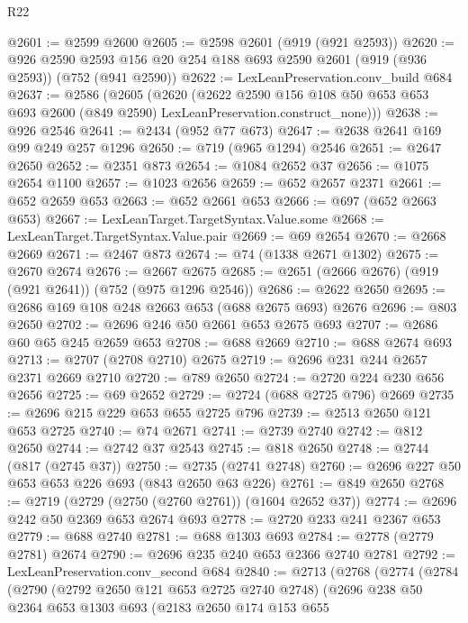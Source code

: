 \begin{lexlean}{R22}
\begin{coremodule}
@2601 := @2599 @2600
@2605 := @2598 @2601 (@919 (@921 @2593))
@2620 := @926
    @2590
    @2593
    @156
    @20
    @254
    @188
    @693
    @2590
    @2601
    (@919 (@936 @2593))
    (@752 (@941 @2590))
@2622 := LexLeanPreservation.conv_build @684
@2637 := @2586
    (@2605
      (@2620
        (@2622
          @2590
          @156
          @108
          @50
          @653
          @653
          @693
          @2600
          (@849 @2590)
          LexLeanPreservation.construct_none)))
@2638 := @926 @2546
@2641 := @2434 (@952 @77 @673)
@2647 := @2638 @2641 @169 @99 @249 @257 @1296
@2650 := @719 (@965 @1294) @2546
@2651 := @2647 @2650
@2652 := @2351 @873
@2654 := @1084 @2652 @37
@2656 := @1075 @2654 @1100
@2657 := @1023 @2656
@2659 := @652 @2657 @2371
@2661 := @652 @2659 @653
@2663 := @652 @2661 @653
@2666 := @697 (@652 @2663 @653)
@2667 := LexLeanTarget.TargetSyntax.Value.some
@2668 := LexLeanTarget.TargetSyntax.Value.pair
@2669 := @69 @2654
@2670 := @2668 @2669
@2671 := @2467 @873
@2674 := @74 (@1338 @2671 @1302)
@2675 := @2670 @2674
@2676 := @2667 @2675
@2685 := @2651 (@2666 @2676) (@919 (@921 @2641)) (@752 (@975 @1296 @2546))
@2686 := @2622 @2650
@2695 := @2686 @169 @108 @248 @2663 @653 (@688 @2675 @693) @2676
@2696 := @803 @2650
@2702 := @2696 @246 @50 @2661 @653 @2675 @693
@2707 := @2686 @60 @65 @245 @2659 @653
@2708 := @688 @2669
@2710 := @688 @2674 @693
@2713 := @2707 (@2708 @2710) @2675
@2719 := @2696 @231 @244 @2657 @2371 @2669 @2710
@2720 := @789 @2650
@2724 := @2720 @224 @230 @656 @2656
@2725 := @69 @2652
@2729 := @2724 (@688 @2725 @796) @2669
@2735 := @2696 @215 @229 @653 @655 @2725 @796
@2739 := @2513 @2650 @121 @653 @2725
@2740 := @74 @2671
@2741 := @2739 @2740
@2742 := @812 @2650
@2744 := @2742 @37 @2543
@2745 := @818 @2650
@2748 := @2744 (@817 (@2745 @37))
@2750 := @2735 (@2741 @2748)
@2760 := @2696 @227 @50 @653 @653 @226 @693 (@843 @2650 @63 @226)
@2761 := @849 @2650
@2768 := @2719 (@2729 (@2750 (@2760 @2761)) (@1604 @2652 @37))
@2774 := @2696 @242 @50 @2369 @653 @2674 @693
@2778 := @2720 @233 @241 @2367 @653
@2779 := @688 @2740
@2781 := @688 @1303 @693
@2784 := @2778 (@2779 @2781) @2674
@2790 := @2696 @235 @240 @653 @2366 @2740 @2781
@2792 := LexLeanPreservation.conv_second @684
@2840 := @2713
    (@2768
      (@2774
        (@2784
          (@2790
            (@2792 @2650 @121 @653 @2725 @2740 @2748)
            (@2696
              @238
              @50
              @2364
              @653
              @1303
              @693
              (@2183
                @2650
                @174
                @153
                @655

\end{coremodule}
\end{lexlean}
